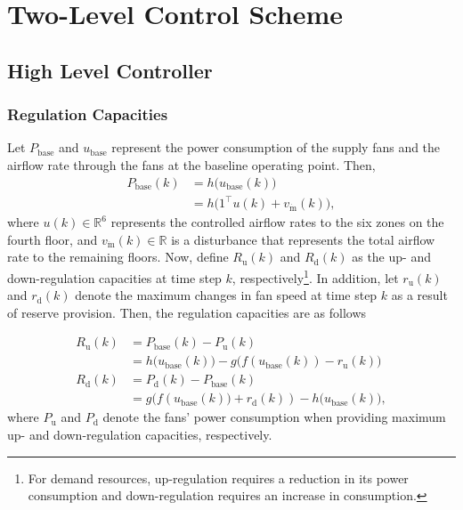 %
%


\section{Two-Level Control Scheme}\label{sec:control}


\subsection{High Level Controller}\label{sec:hlc}
\subsubsection{Regulation Capacities}

Let $P_{\text{base}}$ and $u_{\text{base}}$ represent the power consumption of the supply fans and the airflow rate through the fans at the baseline operating point. Then,
\begin{equation}\label{eq:P}
\begin{aligned}
P_{\text{base}}(k) &= h\big(u_{\text{base}}(k)\big)\\
&=h\big(1^\top u(k) + v_{\dot{\text{m}}}(k)\big),
\end{aligned}
\end{equation}
where $u(k) \in \mathbb{R}^6$ represents the controlled airflow rates to the six zones on the fourth floor, and $v_{\dot{\text{m}}}(k) \in \mathbb{R}$ is a disturbance that represents the total airflow rate to the remaining floors.
Now, define $R_{\text{u}}(k)$ and $R_{\text{d}}(k)$ as the up- and down-regulation capacities at time step $k$, respectively\footnote{For demand resources, up-regulation requires a reduction in its power consumption and down-regulation requires an increase in consumption.}. In addition, let $r_{\text{u}}(k)$ and $r_{\text{d}}(k)$ denote the maximum changes in fan speed at time step $k$ as a result of reserve provision. Then, the regulation capacities are as follows

\begin{equation}\label{eq:Ru_Rd}
\begin{aligned}
R_{\text{u}}(k) & = P_{\text{base}}(k) - P_{\text{u}}(k)\\
 & = h\big(u_{\text{base}}(k)\big) - g\big(f(u_{\text{base}}(k)) - r_{\text{u}}(k)\big)\\
R_{\text{d}}(k) & = P_{\text{d}}(k) - P_{\text{base}}(k)\\
 & = g\big(f(u_{\text{base}}(k)\big) + r_{\text{d}}(k)) - h\big(u_{\text{base}}(k)\big),
\end{aligned}
\end{equation}
\noindent
where $P_{\text{u}}$ and $P_{\text{d}}$ denote the fans' power consumption when providing maximum up- and down-regulation capacities, respectively.

